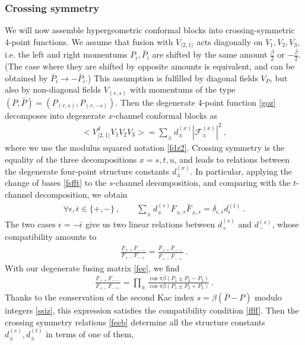 \documentclass[12pt, a4paper]{article}
\theoremstyle{break}
\begin{document}
\subsubsection{Crossing symmetry}

We will now assemble hypergeometric conformal blocks into crossing-symmetric 4-point functions. We assume that fusion with $V_{\langle 2,1\rangle}$ acts diagonally on $V_1,V_2,V_3$, i.e. the left and right momentums $P_i,\bar P_i$ are shifted by the same amount $\frac{\beta}{2}$ or $-\frac{\beta}{2}$. (The case where they are shifted by opposite amounts is equivalent, and can be obtained by $\bar P_i\to -\bar P_i$.) This assumption is fulfilled by diagonal fields $V_P$, but also by non-diagonal fields $V_{(r,s)}$ with momentums of the type $(P,\bar P)= (P_{(r,s)},P_{(r,-s)})$. 
Then the degenerate 4-point function \eqref{goz} decomposes into degenerate $x$-channel conformal blocks as 
\begin{align}
 \Big<V_{\langle 2,1\rangle}^dV_{1}V_{2}V_{3}\Big> 
 = \sum_\pm d^{(x)}_\pm \left|\mathcal{F}^{(x)}_\pm \right|^2  
 \ ,
\end{align}
where we use the modulus squared notation \eqref{fdz2}.
Crossing symmetry is the equality of the three decompositions $x=s,t,u$, and leads to relations between the degenerate four-point structure constants $d^{(x)}_\pm$. In particular, applying the change of bases \eqref{fsfft} to the $s$-channel decomposition, and comparing with the $t$-channel decomposition, we obtain 
\begin{align}
 \forall \epsilon,\bar\epsilon \in \{+,-\}\ , \qquad \sum_\pm d_\pm^{(s)} F_{\pm,\epsilon}\bar F_{\pm, \bar\epsilon} = \delta_{\epsilon,\bar\epsilon} d_\epsilon^{(t)}\ . 
 \label{feeb}
\end{align}
The two cases $\epsilon = -\bar\epsilon$ give us two linear relations between $d^{(s)}_+$ and $d^{(s)}_-$, whose compatibility amounts to 
\begin{align}
 \frac{F_{++}F_{--}}{F_{+-}F_{-+}} = \frac{\bar F_{++}\bar F_{--}}{\bar F_{+-}\bar F_{-+}}\ .
 \label{ffff}
\end{align}
With our degenerate fusing matrix \eqref{fee}, we find 
\begin{align}
 \frac{F_{++}F_{--}}{F_{+-}F_{-+}} = \prod_\pm \frac{\cos \pi \beta(P_1\pm P_2-P_3)}{\cos \pi \beta(P_1\pm P_2+P_3)}\ . 
\end{align}
Thanks to the conservation of the second Kac index $s=\beta(\bar P-P)$ modulo integers \eqref{ssiz}, this expression satisfies the compatibility condition \eqref{ffff}. Then the crossing symmetry relations \eqref{feeb} determine all the structure constants $d^{(s)}_\pm,d^{(t)}_\pm$ in terms of one of them,
\end{document}
